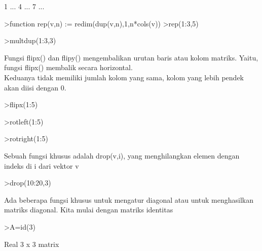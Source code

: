 \documentclass[a4paper,10pt]{article}
\begin{document}
\begin{eulernotebook}
\begin{eulercomment}
\begin{eulercomment}
\begin{eulercomment}
\begin{eulercomment}
\begin{euleroutput}
                        1     ...
                        4     ...
                        7     ...
\end{euleroutput}
\begin{eulerprompt}
>function rep(v,n) := redim(dup(v,n),1,n*cols(v))
>rep(1:3,5)
\end{eulerprompt}
\begin{euleroutput}
  [1,  2,  3,  1,  2,  3,  1,  2,  3,  1,  2,  3,  1,  2,  3]
\end{euleroutput}
\begin{eulerprompt}
>multdup(1:3,3)
\end{eulerprompt}
\begin{euleroutput}
  [1,  1,  1,  2,  2,  2,  3,  3,  3]
\end{euleroutput}
\begin{eulercomment}
Fungsi flipx() dan flipy() mengembalikan urutan baris atau kolom
matriks. Yaitu, fungsi flipx() membalik secara horizontal.\\
Keduanya tidak memiliki jumlah kolom yang sama, kolom yang lebih
pendek akan diisi dengan 0.
\end{eulercomment}
\begin{eulerprompt}
>flipx(1:5)
\end{eulerprompt}
\begin{euleroutput}
  [5,  4,  3,  2,  1]
\end{euleroutput}
\begin{eulerprompt}
>rotleft(1:5)
\end{eulerprompt}
\begin{euleroutput}
  [2,  3,  4,  5,  1]
\end{euleroutput}
\begin{eulerprompt}
>rotright(1:5)
\end{eulerprompt}
\begin{euleroutput}
  [5,  1,  2,  3,  4]
\end{euleroutput}
\begin{eulercomment}
Sebuah fungsi khusus adalah drop(v,i), yang menghilangkan elemen
dengan indeks di i dari vektor v
\end{eulercomment}
\begin{eulerprompt}
>drop(10:20,3)
\end{eulerprompt}
\begin{euleroutput}
  [10,  11,  13,  14,  15,  16,  17,  18,  19,  20]
\end{euleroutput}
\begin{eulercomment}
Ada beberapa fungsi khusus untuk mengatur diagonal atau untuk
menghasilkan matriks diagonal. Kita mulai dengan matriks identitas
\end{eulercomment}
\begin{eulerprompt}
>A=id(3)
\end{eulerprompt}
\begin{euleroutput}
  Real 3 x 3 matrix
  

\end{euleroutput}
\end{eulercomment}
\end{eulercomment}
\end{eulercomment}
\end{eulercomment}
\end{eulernotebook}
\end{document}
